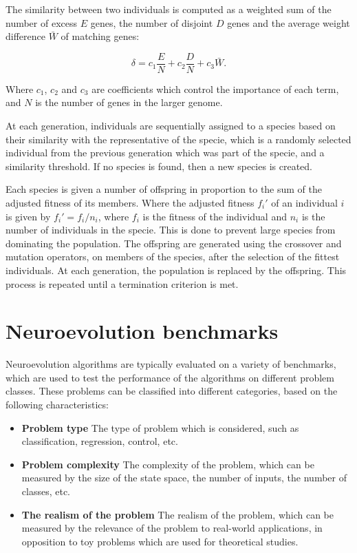 The similarity between two individuals is computed as a weighted sum of the number of excess $E$ genes, the number of disjoint $D$ genes and the average weight difference $\bar{W}$
of matching genes:

\[
    \delta = c_1 \frac{E}{N} + c_2 \frac{D}{N} + c_3 \bar{W}.
\]

Where $c_1$, $c_2$ and $c_3$ are coefficients which control the importance of each term, and $N$ is the number of genes in the larger genome.

At each generation, individuals are sequentially assigned to a species based on their similarity with the representative of the specie, which is
a randomly selected individual from the previous generation which was part of the specie, and a similarity threshold. If no species is found, then a new species is created.

Each species is given a number of offspring in proportion to the sum of the adjusted fitness of its members. Where the adjusted fitness $f_i'$ of an individual $i$ is
given by $f_i' = f_i / n_i$, where $f_i$ is the fitness of the individual and $n_i$ is the number of individuals in the specie. This is done to prevent large species
from dominating the population. The offspring are generated using the crossover and mutation operators, on members of the species, after the selection of the fittest
individuals. At each generation, the population is replaced by the offspring. This process is repeated until a termination criterion is met.

\section{Neuroevolution benchmarks}

Neuroevolution algorithms are typically evaluated on a variety of benchmarks, which are used to test the performance of the algorithms on different problem classes.
These problems can be classified into different categories, based on the following characteristics:

\begin{itemize}
    \item \textbf{Problem type} The type of problem which is considered, such as classification, regression, control, etc.
    \item \textbf{Problem complexity} The complexity of the problem, which can be measured by the size of the state space, the number of inputs, the number of classes, etc.
    \item \textbf{The realism of the problem} The realism of the problem, which can be measured by the relevance of the problem to real-world applications, in opposition to
        toy problems which are used for theoretical studies.
\end{itemize}

